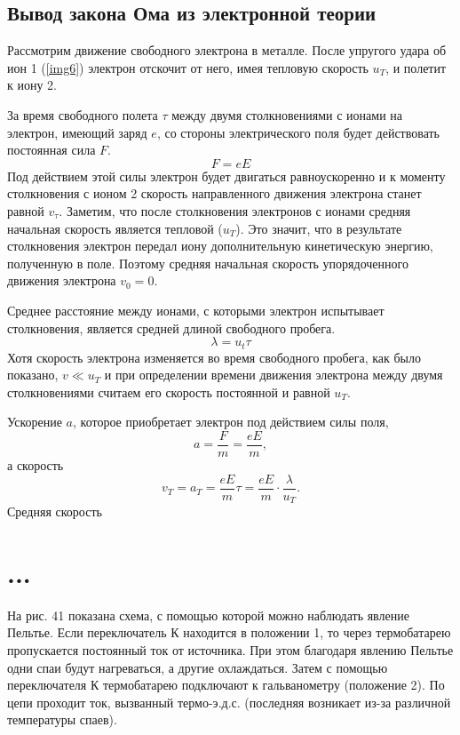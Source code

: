 \documentclass[a4paper,10pt]{book}
\begin{document}
\section{Вывод закона Ома из электронной теории}
Рассмотрим движение свободного электрона в металле. После упругого удара об ион 1 (\ref{img6}) электрон отскочит от него, имея тепловую скорость
$u_T$, и полетит к иону 2.

За время свободного полета $\tau$ между двумя столкновениями с ионами на электрон, имеющий заряд $e$, со стороны электрического поля будет
действовать постоянная сила $F$.
\begin{equation}\label{162}
 F = eE
\end{equation}
Под действием этой силы электрон будет двигаться равноускоренно и к моменту столкновения с ионом 2 скорость направленного движения электрона
станет равной $v_\tau$. Заметим, что после столкновения электронов с ионами средняя начальная скорость является тепловой ($u_T$). Это значит, 
что в результате столкновения электрон передал иону дополнительную кинетическую энергию, полученную в поле. Поэтому средняя начальная скорость
упорядоченного движения электрона $v_0 = 0$.

Среднее расстояние между ионами, с которыми электрон испытывает столкновения, является средней длиной свободного пробега.
\begin{equation}\label{163}
 \lambda = u_t\tau
\end{equation}
Хотя скорость электрона изменяется во время свободного пробега, как было показано, $v \ll u_T$ и при определении времени движения электрона
между двумя столкновениями считаем его скорость постоянной и равной $u_T$.

Ускорение $a$, которое приобретает электрон под действием силы поля,
\begin{equation*}
 a = \frac{F}{m} = \frac{eE}{m},
\end{equation*}
а скорость 
\begin{equation}\label{164}
 v_T = a_T = \frac{eE}{m}\tau = \frac{eE}{m} \cdot \frac{\lambda}{u_T}.
\end{equation}
Средняя скорость



\chapter{...}
На рис. 41 показана схема, с помощью которой можно наблюдать явление Пельтье. Если переключатель К находится в положении 1, то через термобатарею пропускается постоянный ток от источника. При этом благодаря явлению Пельтье одни спаи будут нагреваться, а другие охлаждаться. Затем с помощью переключателя К термобатарею подключают к гальванометру (положение 2). По цепи проходит ток, вызванный термо-э.д.с. (последняя возникает из-за различной температуры спаев).
\end{document}
